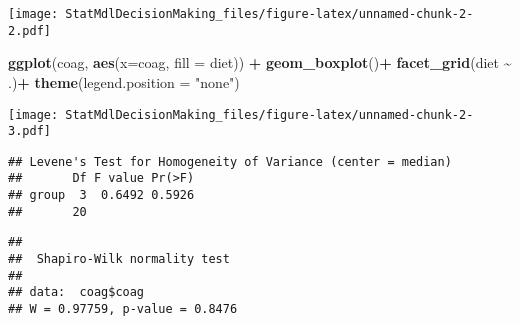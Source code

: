 \documentclass[
]{article}
\newenvironment{Shaded}{\begin{snugshade}}{\end{snugshade}}
\newcommand{\AttributeTok}[1]{\textcolor[rgb]{0.13,0.29,0.53}{#1}}
\newcommand{\CommentTok}[1]{\textcolor[rgb]{0.56,0.35,0.01}{\textit{#1}}}
\newcommand{\FunctionTok}[1]{\textcolor[rgb]{0.13,0.29,0.53}{\textbf{#1}}}
\newcommand{\NormalTok}[1]{#1}
\newcommand{\SpecialCharTok}[1]{\textcolor[rgb]{0.81,0.36,0.00}{\textbf{#1}}}
\newcommand{\StringTok}[1]{\textcolor[rgb]{0.31,0.60,0.02}{#1}}
\begin{document}
\texttt{[image: StatMdlDecisionMaking\_files/figure-latex/unnamed-chunk-2-2.pdf]}

\begin{Shaded}
\begin{Highlighting}[]
    \FunctionTok{ggplot}\NormalTok{(coag, }\FunctionTok{aes}\NormalTok{(}\AttributeTok{x=}\NormalTok{coag, }\AttributeTok{fill =}\NormalTok{ diet)) }\SpecialCharTok{+}
      \FunctionTok{geom\_boxplot}\NormalTok{()}\SpecialCharTok{+}
      \FunctionTok{facet\_grid}\NormalTok{(diet }\SpecialCharTok{\textasciitilde{}}\NormalTok{ .)}\SpecialCharTok{+}
    \FunctionTok{theme}\NormalTok{(}\AttributeTok{legend.position =} \StringTok{"none"}\NormalTok{)}
\end{Highlighting}
\end{Shaded}

\texttt{[image: StatMdlDecisionMaking\_files/figure-latex/unnamed-chunk-2-3.pdf]}

\begin{Shaded}
\end{Shaded}

\begin{verbatim}
## Levene's Test for Homogeneity of Variance (center = median)
##       Df F value Pr(>F)
## group  3  0.6492 0.5926
##       20
\end{verbatim}

\begin{Shaded}
\end{Shaded}

\begin{verbatim}
## 
##  Shapiro-Wilk normality test
## 
## data:  coag$coag
## W = 0.97759, p-value = 0.8476
\end{verbatim}
\end{document}
